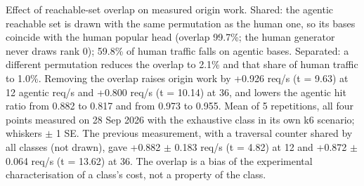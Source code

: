 Effect of reachable-set overlap on measured origin work. Shared: the agentic reachable set is drawn with the same permutation as the human one, so its bases coincide with the human popular head (overlap 99.7\%; the human generator never draws rank 0); 59.8\% of human traffic falls on agentic bases. Separated: a different permutation reduces the overlap to 2.1\% and that share of human traffic to 1.0\%. Removing the overlap raises origin work by +0.926 req/s (t = 9.63) at 12 agentic req/s and +0.800 req/s (t = 10.14) at 36, and lowers the agentic hit ratio from 0.882 to 0.817 and from 0.973 to 0.955. Mean of 5 repetitions, all four points measured on 28 Sep 2026 with the exhaustive class in its own k6 scenario; whiskers $\pm$ 1 SE. The previous measurement, with a traversal counter shared by all classes (not drawn), gave +0.882 $\pm$ 0.183 req/s (t = 4.82) at 12 and +0.872 $\pm$ 0.064 req/s (t = 13.62) at 36. The overlap is a bias of the experimental characterisation of a class's cost, not a property of the class.
